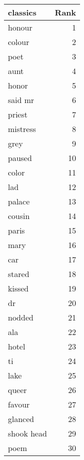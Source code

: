 \begin{table}
\label{tab:classics_terms}
\begin{tabular}{lr}
\toprule
classics & Rank \\
\midrule
honour & 1 \\
colour & 2 \\
poet & 3 \\
aunt & 4 \\
honor & 5 \\
said mr & 6 \\
priest & 7 \\
mistress & 8 \\
grey & 9 \\
paused & 10 \\
color & 11 \\
lad & 12 \\
palace & 13 \\
cousin & 14 \\
paris & 15 \\
mary & 16 \\
car & 17 \\
stared & 18 \\
kissed & 19 \\
dr & 20 \\
nodded & 21 \\
ala & 22 \\
hotel & 23 \\
ti & 24 \\
lake & 25 \\
queer & 26 \\
favour & 27 \\
glanced & 28 \\
shook head & 29 \\
poem & 30 \\
\bottomrule
\end{tabular}
\end{table}
